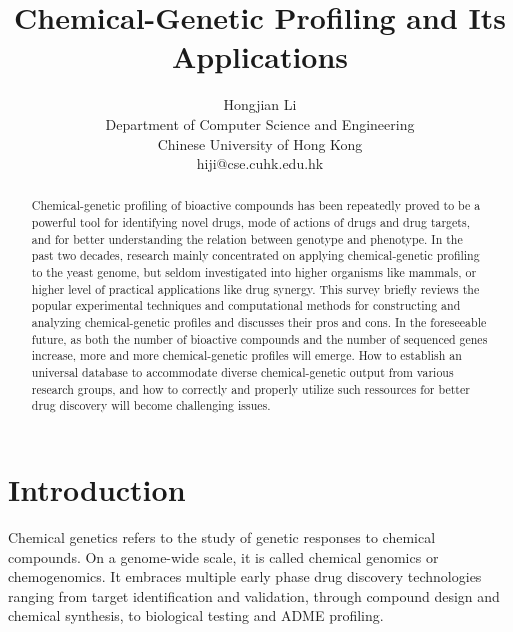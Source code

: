 \documentclass[12pt,fullpage,singlespace]{article}
\begin{document}
\title{Chemical-Genetic Profiling and Its Applications}
\author
{
Hongjian Li\\
Department of Computer Science and Engineering\\
Chinese University of Hong Kong\\
hiji@cse.cuhk.edu.hk
}
\maketitle


\begin{abstract}

Chemical-genetic profiling of bioactive compounds has been repeatedly proved to be a powerful tool for identifying novel drugs, mode of actions of drugs and drug targets, and for better understanding the relation between genotype and phenotype. In the past two decades, research mainly concentrated on applying chemical-genetic profiling to the yeast genome, but seldom investigated into higher organisms like mammals, or higher level of practical applications like drug synergy. This survey briefly reviews the popular experimental techniques and computational methods for constructing and analyzing chemical-genetic profiles and discusses their pros and cons. In the foreseeable future, as both the number of bioactive compounds and the number of sequenced genes increase, more and more chemical-genetic profiles will emerge. How to establish an universal database to accommodate diverse chemical-genetic output from various research groups, and how to correctly and properly utilize such ressources for better drug discovery will become challenging issues.

\end{abstract}




\section{Introduction}

Chemical genetics refers to the study of genetic responses to chemical compounds. On a genome-wide scale, it is called chemical genomics or chemogenomics. It embraces multiple early phase drug discovery technologies ranging from target identification and validation, through compound design and chemical synthesis, to biological testing and ADME profiling.
\end{document}
